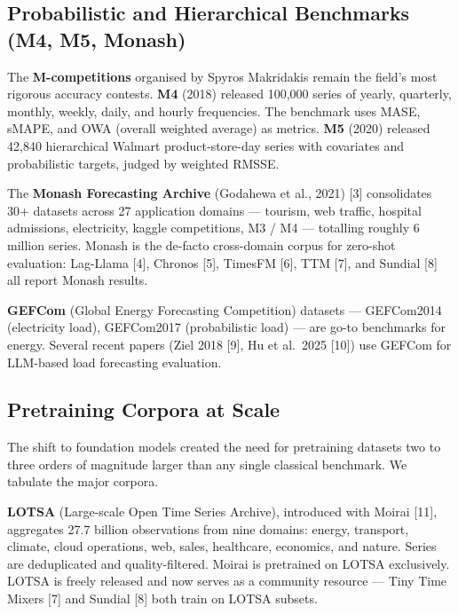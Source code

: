 \subsection{Probabilistic and Hierarchical Benchmarks (M4, M5, Monash)}\label{probabilistic-and-hierarchical-benchmarks-m4-m5-monash}

The \textbf{M-competitions} organised by Spyros Makridakis remain the field's most rigorous accuracy contests. \textbf{M4} (2018) released 100,000 series of yearly, quarterly, monthly, weekly, daily, and hourly frequencies. The benchmark uses MASE, sMAPE, and OWA (overall weighted average) as metrics. \textbf{M5} (2020) released 42,840 hierarchical Walmart product-store-day series with covariates and probabilistic targets, judged by weighted RMSSE.

The \textbf{Monash Forecasting Archive} (Godahewa et al., 2021) {[}3{]} consolidates 30+ datasets across 27 application domains --- tourism, web traffic, hospital admissions, electricity, kaggle competitions, M3 / M4 --- totalling roughly 6 million series. Monash is the de-facto cross-domain corpus for zero-shot evaluation: Lag-Llama {[}4{]}, Chronos {[}5{]}, TimesFM {[}6{]}, TTM {[}7{]}, and Sundial {[}8{]} all report Monash results.

\textbf{GEFCom} (Global Energy Forecasting Competition) datasets --- GEFCom2014 (electricity load), GEFCom2017 (probabilistic load) --- are go-to benchmarks for energy. Several recent papers (Ziel 2018 {[}9{]}, Hu et al.~2025 {[}10{]}) use GEFCom for LLM-based load forecasting evaluation.

\subsection{Pretraining Corpora at Scale}\label{pretraining-corpora-at-scale}

The shift to foundation models created the need for pretraining datasets two to three orders of magnitude larger than any single classical benchmark. We tabulate the major corpora.

\textbf{LOTSA} (Large-scale Open Time Series Archive), introduced with Moirai {[}11{]}, aggregates 27.7 billion observations from nine domains: energy, transport, climate, cloud operations, web, sales, healthcare, economics, and nature. Series are deduplicated and quality-filtered. Moirai is pretrained on LOTSA exclusively. LOTSA is freely released and now serves as a community resource --- Tiny Time Mixers {[}7{]} and Sundial {[}8{]} both train on LOTSA subsets.

